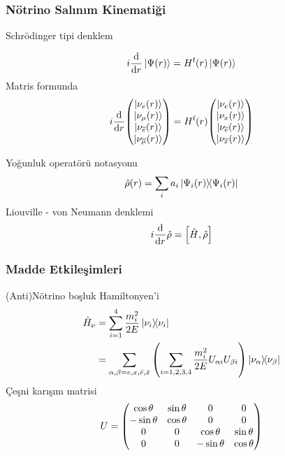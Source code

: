 \documentclass[10pt]{beamer}
\begin{document}
\begin{frame}[noframenumbering]
    \frametitle{Nötrino Salınım Kinematiği}
\begin{minipage}{0.45\textwidth}
Schrödinger tipi denklem

\begin{align*}
    i\dv{r} \ket{\Psi(r)}= H^{\text{f}}(r) \ket{\Psi(r)}
\end{align*}
Matris formunda 
\begin{equation*}
    i\dv{r} \mqty(\ket{\nu_{e}(r)} \\ \ket{\nu_{\mu}(r)}\\ \ket{\nu_{\overline{e}}(r)}\\ \ket{\nu_{\overline{\mu}}(r)}) = H^{\text{f}}(r) \mqty(\ket{\nu_{e}(r)} \\ \ket{\nu_{x}(r)}\\ \ket{\nu_{\overline{e}}(r)}\\ \ket{\nu_{\overline{x}}(r)})
\end{equation*}
\end{minipage}%
\hfill
\begin{minipage}{0.45\textwidth}
    Yoğunluk operatörü notasyonu
\begin{equation*}
    \hat{\rho} (r) = \sum_{i} a_{i} \dyad{\Psi_{i}(r)}{\Psi_{i}(r)}
\end{equation*}
Liouville - von Neumann denklemi
\begin{equation*}
    i \dv{r} \hat{\rho} = \comm{\hat{H}}{\hat{\rho}}
\end{equation*}
\end{minipage}
\end{frame}

\begin{frame}
    \frametitle{Madde Etkileşimleri}
(Anti)Nötrino boşluk Hamiltonyen'i
\begin{align*}
    \hat{H}_{\nu} & = \sum^{4}_{i=1} \frac{m_{i}^{2}}{2E} \dyad{\nu_{i}}{\nu_{i}}\\
	              & = \sum_{\alpha,\beta = e,x,\bar{e},\bar{x}} \qty(\sum_{i=1,2,3,4} \frac{m_{i}^{2}}{2E} U_{\alpha i} U_{\beta i})\dyad{\nu_{\alpha}}{\nu_{\beta}}
\end{align*}
Çeşni karışım matrisi
\begin{equation*}
    U= \mqty( \cos \theta & \sin \theta & 0 & 0 \\ -\sin \theta & \cos \theta & 0 & 0 \\ 0 & 0 & \cos \theta & \sin \theta\\ 0 & 0 & - \sin \theta & \cos \theta)
\end{equation*}
\end{frame}
\end{document}
